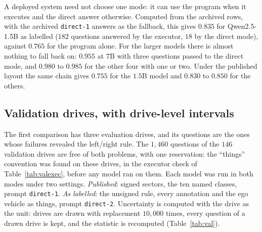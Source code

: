 \documentclass[11pt,a4paper]{article}
\newcommand{\code}[1]{\texttt{\small #1}}
\begin{document}
A deployed system need not choose one mode: it can use the program when it
executes and the direct answer otherwise. Computed from the archived rows,
with the archived \code{direct-1} answers as the fallback, this gives $0.835$
for Qwen2.5-1.5B as labelled ($182$ questions answered by the executor, $18$
by the direct mode), against $0.765$ for the program alone. For the larger
models there is almost nothing to fall back on: $0.955$ at $7$B with three
questions passed to the direct mode, and $0.980$ to $0.985$ for the other
four with one or two. Under the published layout the same chain gives $0.755$
for the $1.5$B model and $0.830$ to $0.850$ for the others.

\subsection{Validation drives, with drive-level intervals}
\label{sec:val}

The first comparison has three evaluation drives, and its questions are the
ones whose failures revealed the left/right rule. The $1{,}460$ questions of
the $146$ validation drives are free of both problems, with one reservation:
the ``things'' convention was found on these drives, in the executor check of
Table~\ref{tab:valexec}, before any model ran on them. Each model was run in
both modes under two settings. \emph{Published}: signed sectors, the ten
named classes, prompt \code{direct-1}. \emph{As labelled}: the unsigned rule,
every annotation and the ego vehicle as things, prompt \code{direct-2}.
Uncertainty is computed with the drive as the unit: drives are drawn with
replacement $10{,}000$ times, every question of a drawn drive is kept, and
the statistic is recomputed (Table~\ref{tab:val}).
\end{document}
